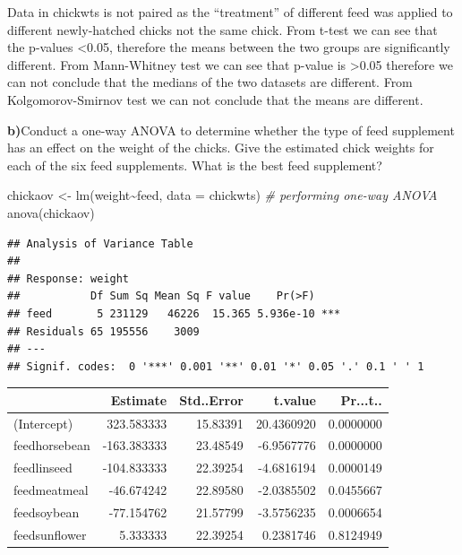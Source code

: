 \documentclass[
]{article}
\newenvironment{Shaded}{\begin{snugshade}}{\end{snugshade}}
\newcommand{\AttributeTok}[1]{\textcolor[rgb]{0.77,0.63,0.00}{#1}}
\newcommand{\CommentTok}[1]{\textcolor[rgb]{0.56,0.35,0.01}{\textit{#1}}}
\newcommand{\FunctionTok}[1]{\textcolor[rgb]{0.00,0.00,0.00}{#1}}
\newcommand{\NormalTok}[1]{#1}
\newcommand{\OtherTok}[1]{\textcolor[rgb]{0.56,0.35,0.01}{#1}}
\newcommand{\SpecialCharTok}[1]{\textcolor[rgb]{0.00,0.00,0.00}{#1}}
\newcommand{\StringTok}[1]{\textcolor[rgb]{0.31,0.60,0.02}{#1}}
\begin{document}
Data in chickwts is not paired as the ``treatment'' of different feed
was applied to different newly-hatched chicks not the same chick. From
t-test we can see that the p-values \textless0.05, therefore the means
between the two groups are significantly different. From Mann-Whitney
test we can see that p-value is \textgreater0.05 therefore we can not
conclude that the medians of the two datasets are different. From
Kolgomorov-Smirnov test we can not conclude that the means are
different.

\textbf{b)}Conduct a one-way ANOVA to determine whether the type of feed
supplement has an effect on the weight of the chicks. Give the estimated
chick weights for each of the six feed supplements. What is the best
feed supplement?

\begin{Shaded}
\begin{Highlighting}[]
\NormalTok{chickaov }\OtherTok{\textless{}{-}} \FunctionTok{lm}\NormalTok{(weight}\SpecialCharTok{\textasciitilde{}}\NormalTok{feed, }\AttributeTok{data =}\NormalTok{ chickwts)}
\CommentTok{\# performing one{-}way ANOVA}
\FunctionTok{anova}\NormalTok{(chickaov)}
\end{Highlighting}
\end{Shaded}

\begin{verbatim}
## Analysis of Variance Table
## 
## Response: weight
##           Df Sum Sq Mean Sq F value    Pr(>F)    
## feed       5 231129   46226  15.365 5.936e-10 ***
## Residuals 65 195556    3009                      
## ---
## Signif. codes:  0 '***' 0.001 '**' 0.01 '*' 0.05 '.' 0.1 ' ' 1
\end{verbatim}

\begin{Shaded}
\end{Shaded}

\begin{tabular}{l|r|r|r|r}
\hline
  & Estimate & Std..Error & t.value & Pr...t..\\
\hline
(Intercept) & 323.583333 & 15.83391 & 20.4360920 & 0.0000000\\
\hline
feedhorsebean & -163.383333 & 23.48549 & -6.9567776 & 0.0000000\\
\hline
feedlinseed & -104.833333 & 22.39254 & -4.6816194 & 0.0000149\\
\hline
feedmeatmeal & -46.674242 & 22.89580 & -2.0385502 & 0.0455667\\
\hline
feedsoybean & -77.154762 & 21.57799 & -3.5756235 & 0.0006654\\
\hline
feedsunflower & 5.333333 & 22.39254 & 0.2381746 & 0.8124949\\
\hline
\end{tabular}
\end{document}
